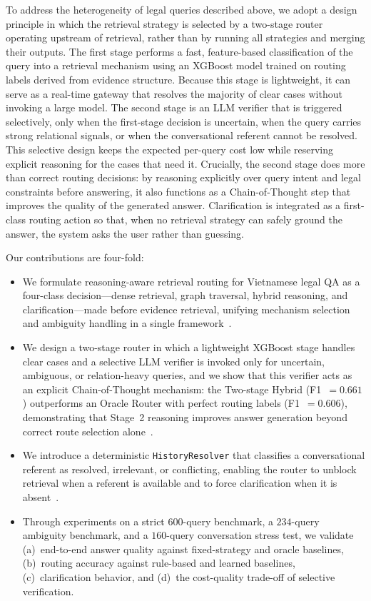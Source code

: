 ﻿\documentclass[11pt,twocolumn]{article}
\begin{document}
To address the heterogeneity of legal queries described above, we adopt a
design principle in which the retrieval strategy is selected by a
two-stage router operating upstream of retrieval, rather than by running
all strategies and merging their outputs. The first stage performs a fast,
feature-based classification of the query into a retrieval mechanism using
an XGBoost model trained on routing labels derived from evidence
structure. Because this stage is lightweight, it can serve as a real-time
gateway that resolves the majority of clear cases without invoking a large
model. The second stage is an LLM verifier that is triggered selectively,
only when the first-stage decision is uncertain, when the query carries
strong relational signals, or when the conversational referent cannot be
resolved. This selective design keeps the expected per-query cost low
while reserving explicit reasoning for the cases that need it. Crucially,
the second stage does more than correct routing decisions: by reasoning
explicitly over query intent and legal constraints before answering, it
also functions as a Chain-of-Thought step that improves the quality of the
generated answer. Clarification is integrated as a first-class routing
action so that, when no retrieval strategy can safely ground the answer,
the system asks the user rather than guessing.

Our contributions are four-fold:
\begin{itemize}
  \item We formulate reasoning-aware retrieval routing for Vietnamese
  legal QA as a four-class decision---dense retrieval, graph traversal,
  hybrid reasoning, and clarification---made before evidence retrieval,
  unifying mechanism selection and ambiguity handling in a single
  framework~\cite{jeong2024adaptive,min2020ambigqa}.

  \item We design a two-stage router in which a lightweight XGBoost stage
  handles clear cases and a selective LLM verifier is invoked only for
  uncertain, ambiguous, or relation-heavy queries, and we show that this
  verifier acts as an explicit Chain-of-Thought mechanism: the Two-stage
  Hybrid (F1~$=0.661$) outperforms an Oracle Router with perfect routing
  labels (F1~$=0.606$), demonstrating that Stage~2 reasoning improves
  answer generation beyond correct route selection
  alone~\cite{chen2023frugalgpt}.

  \item We introduce a deterministic \texttt{HistoryResolver} that
  classifies a conversational referent as resolved, irrelevant, or
  conflicting, enabling the router to unblock retrieval when a referent is
  available and to force clarification when it is
  absent~\cite{elgohary2019canard}.

  \item Through experiments on a strict $600$-query benchmark, a
  $234$-query ambiguity benchmark, and a $160$-query conversation stress
  test, we validate (a)~end-to-end answer quality against fixed-strategy
  and oracle baselines, (b)~routing accuracy against rule-based and
  learned baselines, (c)~clarification behavior, and (d)~the cost-quality
  trade-off of selective verification.
\end{itemize}
\end{document}
